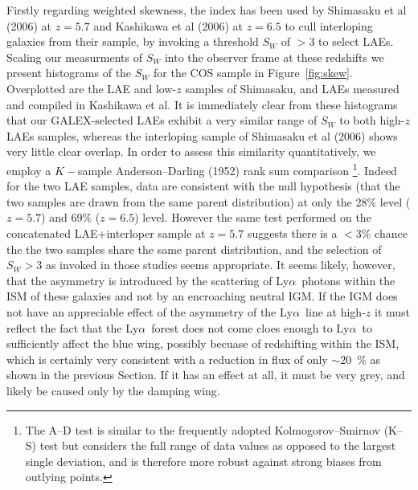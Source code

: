 \documentclass[manuscript]{emulateapj}
\newcommand{\lya}{Ly$\alpha$}
\begin{document}
Firstly regarding weighted skewness, the index has been used by Shimasaku 
et al (2006) at $z=5.7$ and Kashikawa et al (2006) at $z=6.5$ to cull 
interloping galaxies from their sample, by invoking a threshold $S_W$ of $>3$ 
to select LAEs. Scaling our measurments of $S_W$ into the observer frame at
these redshifts we present histograms of the $S_W$ for the COS sample in
Figure~\ref{fig:skew}. Overplotted are the LAE and low-$z$ samples of Shimasaku, 
and LAEs measured and compiled in Kashikawa et al. It is immediately clear from
these histograms that our GALEX-selected LAEs exhibit a very similar range of 
$S_W$ to both high-$z$ LAEs samples, whereas the interloping sample of 
Shimasaku et al (2006) shows very little clear overlap. In order to assess 
this similarity quantitatively, we employ a $K-$sample Anderson--Darling (1952) 
rank sum comparison \footnote{The A--D test is similar to the frequently adopted
Kolmogorov–Smirnov (K--S) test but  considers the full range of data values as 
opposed to the largest single deviation, and is therefore more robust against
strong biases from outlying points.}. Indeed for the two LAE samples, data are 
consistent with the null hypothesis (that the two samples are drawn from the 
same parent distribution)  at only the 28\% level ($z=5.7$) and 69\% ($z=6.5$)
level. However the same test performed on the concatenated LAE+interloper 
sample at $z=5.7$ suggests there is a $<3$\% chance the the two samples 
share the same parent distribution, and the selection of $S_W>3$ as invoked
in those studies seems appropriate. It seems likely, however, that the asymmetry
is introduced by the scattering of \lya\ photons within the ISM of these galaxies
and not by an encroaching neutral IGM. If the IGM does not have an appreciable 
effect of the asymmetry of the \lya\ line at high-$z$ it must reflect the fact
that the \lya\ forest does not come cloes enough to \lya\ to sufficiently 
affect the blue wing, possibly becuase of redshifting within the ISM, which is
certainly very consistent with a reduction in flux of only $\sim 20$~\% as shown
in the previous Section. If it has an effect at all, it must be very grey, and 
likely be caused only by the damping wing. 
\end{document}
